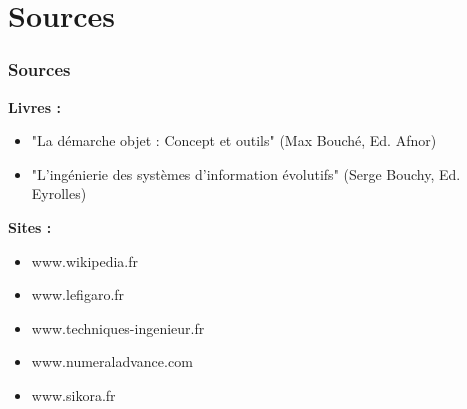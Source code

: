 \documentclass[10pt]{beamer}
\begin{document}
\section{Sources}

\begin{frame}
\frametitle{Sources}
{\large \textbf{Livres :} }
     \begin{itemize}
     \item "La démarche objet : Concept et outils" (Max Bouché, Ed. Afnor)
     \item "L'ingénierie des systèmes d'information évolutifs" (Serge Bouchy, Ed. Eyrolles)
     \end{itemize}

\bigskip

{\large \textbf{Sites :} }
     \begin{itemize}
     \item www.wikipedia.fr
     \item www.lefigaro.fr
     \item www.techniques-ingenieur.fr
     \item www.numeraladvance.com
     \item www.sikora.fr
     \end{itemize}
     
\end{frame}
\end{document}
